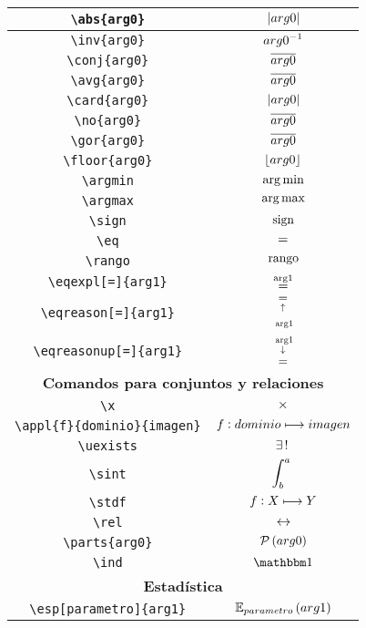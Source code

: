 \begin{longtable}{|c|c|}
\verb|\abs{arg0}| & $\displaystyle\left\vert arg0 \right\vert$ \\ \midrule 
\verb|\inv{arg0}| & $\displaystyle{arg0}^{-1}$ \\ \midrule 
\verb|\conj{arg0}| & $\displaystyle\overline{arg0}$ \\ \midrule 
\verb|\avg{arg0}| & $\displaystyle\overline{arg0}$ \\ \midrule 
\verb|\card{arg0}| & $\displaystyle\left\vert arg0 \right\vert$ \\ \midrule 
\verb|\no{arg0}| & $\displaystyle\overline{arg0}$ \\ \midrule 
\verb|\gor{arg0}| & $\displaystyle\overline{arg0}$ \\ \midrule 
\verb|\floor{arg0}| & $\displaystyle\left\lfloor arg0 \right\rfloor$ \\ \midrule 
\verb|\argmin| & $\displaystyle\operatorname*{arg\,min}$ \\ \midrule 
\verb|\argmax| & $\displaystyle\operatorname*{arg\,max}$ \\ \midrule 
\verb|\sign| & $\displaystyle\operatorname{sign}$ \\ \midrule 
\verb|\eq| & $\displaystyle=$ \\ \midrule 
\verb|\rango| & $\displaystyle\operatorname{rango}$ \\ \midrule 
\verb|\eqexpl[=]{arg1}| & $\displaystyle\eqexpl[=]{arg1}$ \\ \midrule 
\verb|\eqreason[=]{arg1}| & $\displaystyle\eqreason[=]{arg1}$ \\ \midrule 
\verb|\eqreasonup[=]{arg1}| & $\displaystyle\eqreasonup[=]{arg1}$ \\ \midrule 
\bottomrule \multicolumn{2}{|c|}{\textbf{Comandos para conjuntos y relaciones}} \\ \toprule 
\verb|\x| & $\displaystyle\times$ \\ \midrule 
\verb|\appl{f}{dominio}{imagen}| & $\displaystyle f : dominio\longmapsto imagen$ \\ \midrule 
\verb|\uexists| & $\displaystyle\exists\, !\;$ \\ \midrule 
\verb|\sint| & $\displaystyle\int_b^a\;$ \\ \midrule 
\verb|\stdf| & $\displaystyle f : X\longmapsto Y$ \\ \midrule 
\verb|\rel| & $\displaystyle\rel$ \\ \midrule 
\verb|\parts{arg0}| & $\displaystyle\mathcal{P}\left(arg0\right)$ \\ \midrule 
\verb|\ind| & $\displaystyle\ind$ \\ \midrule 
\bottomrule \multicolumn{2}{|c|}{\textbf{Estadística}} \\ \toprule 
\verb|\esp[parametro]{arg1}| & $\displaystyle\esp[parametro]{arg1}$ \\ \midrule 

\end{longtable}
